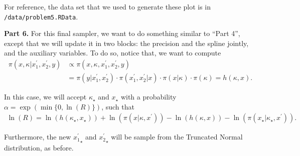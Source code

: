 \documentclass[12pt]{article}\usepackage[]{graphicx}\usepackage[]{color}
\begin{document}
For reference, the data set that we used to generate these plot is in \texttt{/data/problem5.RData}.

\newpage

\textbf{Part 6.}
For this final sampler, we want to do something similar to ``Part 4'', except that we will update it in two blocks: the precision and the spline jointly, and the auxiliary variables. To do so, notice that, we want to compute
\begin{align*}
\pi(x, \kappa| x_1^{\prime}, x_2^{\prime}, y) &\propto \pi(x, \kappa, x_1^{\prime}, x_2^{\prime}, y) \\
& = \pi(y|x_1^{\prime}, x_2^{\prime}) \cdot \pi(x_1^{\prime}, x_2^{\prime}| x) \cdot \pi(x| \kappa) \cdot \pi(\kappa) = h(\kappa, x).
\end{align*}

In this case, we will accept $\kappa_{\star}$ and $x_{\star}$ with a probability $\alpha = \exp(\min\{0, \ln(R)\})$, such that 
\begin{align*}
\ln(R) = \ln(h(\kappa_{\star}, x_{\star})) + \ln(\pi(x | \kappa, x^{\prime})) - \ln(h(\kappa, x)) - \ln(\pi(x_{\star}|\kappa_{\star}, x^{\prime})). 
\end{align*}

Furthermore, the new ${x_1^{\prime}}_{\star}$ and ${x_2^{\prime}}_{\star}$ will be sample from the Truncated Normal distribution, as before.
\end{document}
